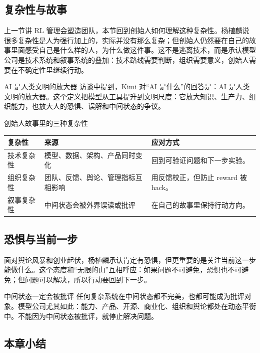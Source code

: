 \documentclass[a4paper]{article}
\begin{document}
\subsection{复杂性与故事}

上一节讲 RL 管理会塑造团队，本节回到创始人如何理解这种复杂性。杨植麟说很多复杂性是人为强行加上的，实际并没有那么复杂；但创始人仍然要在自己的故事里面感受自己是什么样的人，为什么做这件事。这不是逃离技术，而是承认模型公司是技术系统和叙事系统的叠加：技术路线需要判断，组织需要意义，创始人需要在不确定性里继续行动。

\begin{importantbox}{AI 是人类文明的放大器}
访谈中提到，Kimi 对“AI 是什么”的回答是：AI 是人类文明的放大器。这个定义把模型从工具提升到文明尺度：它放大知识、生产力、组织能力，也放大人的恐惧、误解和中间状态的争议。
\end{importantbox}

\begin{knowledgebox}{创始人故事里的三种复杂性}
\begin{tabularx}{\textwidth}{p{}p{}X}
\toprule
复杂性 & 来源 & 应对方式 \\
\midrule
技术复杂性 & 模型、数据、架构、产品同时变化 & 回到可验证问题和下一步实验。 \\
组织复杂性 & 团队、反馈、舆论、管理指标互相影响 & 用反馈校正，但防止 reward 被 hack。 \\
叙事复杂性 & 中间状态会被外界误读或批评 & 在自己的故事里保持行动方向。 \\
\bottomrule
\end{tabularx}
\end{knowledgebox}

\subsection{恐惧与当前一步}

面对舆论风暴和创业起伏，杨植麟承认肯定有恐惧，但更重要的是关注当前这一步能做什么。这个态度和“无限的山”互相呼应：如果问题不可避免，恐惧也不可避免；但问题可以解决，所以行动要回到下一步。

\begin{warningbox}{中间状态一定会被批评}
任何复杂系统在中间状态都不完美，也都可能成为批评对象。模型公司尤其如此：能力、产品、开源、商业化、组织和舆论都处在动态平衡中。不能因为中间状态被批评，就停止解决问题。
\end{warningbox}

\subsection{本章小结}
\end{document}
